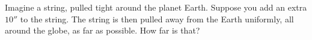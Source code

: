 \documentclass[noauthor,nooutcomes]{ximera}
\begin{document}
\begin{exercise}
Imagine a string, pulled tight around the planet Earth. Suppose you
add an extra $10''$ to the string. The string is then pulled away from
the Earth uniformly, all around the globe, as far as possible. How far
is that?
\end{exercise}






\end{document}
